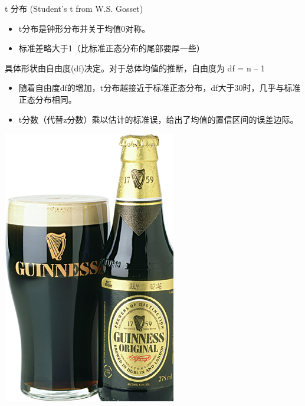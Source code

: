 \documentclass[presentation]{beamer}
\begin{document}
\begin{frame}[label={sec:orga1e82be}]{t 分布  (Student’s t from W.S. Gosset)}
\begin{itemize}
\item t分布是钟形分布并关于均值0对称。

\item 标准差略大于1（比标准正态分布的尾部要厚一些）
\end{itemize}
具体形状由自由度(df)决定。对于总体均值的推断，自由度为 df = n – 1 

\begin{itemize}
\item 随着自由度df的增加，t分布越接近于标准正态分布，df大于30时，几乎与标准正态分布相同。

\item t分数（代替z分数）乘以估计的标准误，给出了均值的置信区间的误差边际。
\end{itemize}
\begin{center}
\includegraphics[width=.9\linewidth]{./image1.png}
\end{center}
\end{frame}
\end{document}
